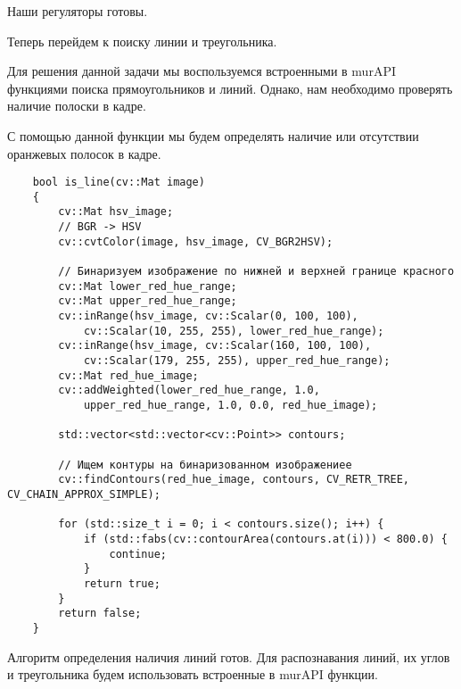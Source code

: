 Наши регуляторы готовы. 

Теперь перейдем к поиску линии и треугольника. 

Для решения данной задачи мы воспользуемся встроенными в murAPI функциями поиска прямоугольников и линий. Однако, нам необходимо проверять наличие полоски в кадре. 

С помощью данной функции мы будем определять наличие или отсутствии оранжевых полосок в кадре.

\begin{verbatim}
    bool is_line(cv::Mat image)
    {
        cv::Mat hsv_image;
        // BGR -> HSV
        cv::cvtColor(image, hsv_image, CV_BGR2HSV);
    
        // Бинаризуем изображение по нижней и верхней границе красного
        cv::Mat lower_red_hue_range;
        cv::Mat upper_red_hue_range;
        cv::inRange(hsv_image, cv::Scalar(0, 100, 100), 
            cv::Scalar(10, 255, 255), lower_red_hue_range);
        cv::inRange(hsv_image, cv::Scalar(160, 100, 100), 
            cv::Scalar(179, 255, 255), upper_red_hue_range);
        cv::Mat red_hue_image;
        cv::addWeighted(lower_red_hue_range, 1.0, 
            upper_red_hue_range, 1.0, 0.0, red_hue_image);
    
        std::vector<std::vector<cv::Point>> contours;
    
        // Ищем контуры на бинаризованном изображениее
        cv::findContours(red_hue_image, contours, CV_RETR_TREE, CV_CHAIN_APPROX_SIMPLE);
    
        for (std::size_t i = 0; i < contours.size(); i++) {
            if (std::fabs(cv::contourArea(contours.at(i))) < 800.0) {
                continue;
            }
            return true;
        }
        return false;
    }    
\end{verbatim}

Алгоритм определения наличия линий готов. Для распознавания линий, их углов и треугольника будем использовать встроенные в murAPI функции.

